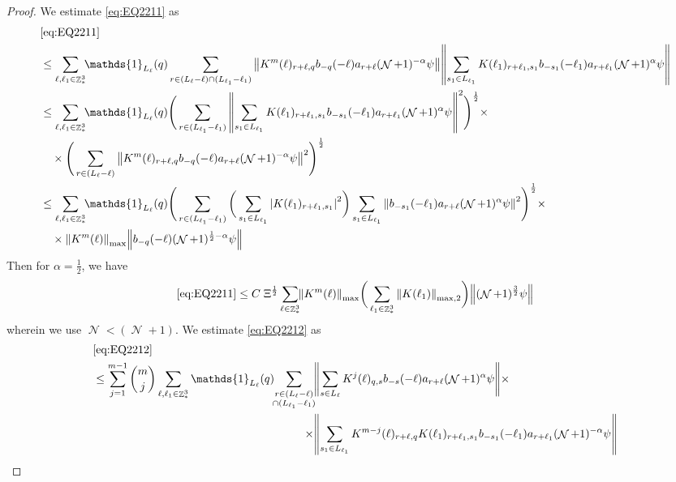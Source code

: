 \documentclass[sn-mathphys, Numbered ,a4paper]{sn-jnl}%
\DeclareMathOperator{\Z}{\mathbb{Z}}
\DeclareMathOperator{\NN}{\mathcal{N}}
\newcommand{\half}{\frac{1}{2}}
\theoremstyle{plain}
\theoremstyle{definition}
\theoremstyle{remark}
\theoremstyle{plain}
\theoremstyle{definition}
\theoremstyle{remark}
\begin{document}
{\begin{proof}
 We estimate \eqref{eq:EQ2211} as
 \begin{align}
 	&\eqref{eq:EQ2211}\nonumber\\
 	&\leq\sum\limits_{\ell,\ell_1 \in \Z^3_*} \!\!\mathds{1}_{L_\ell}(q) \sum\limits_{r\in (L_{\ell}-\ell) \cap (L_{\ell_1}-\ell_1)}    \norm{ K^{m}(\ell)_{r+\ell,q} b_{-q}(-\ell) a_{r+\ell} (\NN+1)^{-\alpha}\psi}\norm{ \sum\limits_{s_1 \in L_{\ell_1}} K(\ell_1)_{r+\ell_1,s_1} b_{-s_1}(-\ell_1)   a_{r+\ell_1} (\NN+1)^{\alpha}\psi } \nonumber\\
 	&\leq \sum\limits_{\ell,\ell_1 \in \Z^3_*} \!\!\mathds{1}_{L_\ell}(q) \Bigg( \sum\limits_{r\in (L_{\ell_1}-\ell_1)} \norm{\sum\limits_{s_1 \in L_{\ell_1}} K(\ell_1)_{r+\ell_1,s_1} b_{-s_1}(-\ell_1) a_{r+\ell_1} (\NN+1)^{\alpha}\psi}^2\Bigg)^\half \times\nonumber\\
 	&\quad \times \Bigg( \sum\limits_{r\in (L_{\ell}-\ell)}  \norm{K^{m}(\ell)_{r+\ell,q}  b_{-q}(-\ell) a_{r+\ell} (\NN+1)^{-\alpha}\psi }^2\Bigg)^\half \nonumber\\
 	&\leq \sum\limits_{\ell,\ell_1 \in \Z^3_*} \!\!\mathds{1}_{L_\ell}(q) \Bigg( \sum\limits_{r\in (L_{\ell_1}-\ell_1)} \bigg( \sum\limits_{s_1 \in L_{\ell_1}}\abs{K(\ell_1)_{r+\ell_1,s_1}}^2\bigg) \sum\limits_{s_1 \in L_{\ell_1}} \norm{ b_{-s_1}(-\ell_1)  a_{r+\ell} (\NN+1)^{\alpha}\psi}^2\Bigg)^\half \times\nonumber\\
 	&\quad \times  \norm{  K^{m}(\ell)}_{\mathrm{max}} \norm{b_{-q}(-\ell) (\NN+1)^{\half-\alpha}\psi } \nonumber
 \end{align}
 Then for $\alpha = \half$, we have 
 \begin{equation}
 	\eqref{eq:EQ2211}\leq C\;\Xi^\half \sum\limits_{\ell \in \Z^3_*} \!\! \norm{  K^{m}(\ell)}_{\mathrm{max}} \bigg(\sum\limits_{\ell_1 \in \Z^3_*} \norm{K(\ell_1)}_{\mathrm{max,2}} \bigg) \norm{ (\NN+1)^{\frac{3}{2}}\psi}  \label{eq:estEQ2211} 
 \end{equation}
 wherein we use $\NN<(\NN+1)$.
 We estimate \eqref{eq:EQ2212} as 
   \begin{alignat}{2}
 	&\eqref{eq:EQ2212}\nonumber\\
 	&\leq \sum\limits_{j=1}^{m-1} {{m}\choose j} \sum\limits_{\ell, \ell_1\in \Z^3_*} \mathds{1}_{L_{\ell}}(q)\!\! \begin{aligned}[t]
 		\sum\limits_{\substack{r\in (L_{\ell}-\ell) \\ \cap (L_{\ell_1}-\ell_1)}}\! &\norm{ \sum\limits_{s \in L_\ell} K^{j}(\ell)_{q,s}  b_{-s}(-\ell) a_{r+\ell} (\NN+1)^{\alpha}\psi}\times\nonumber \\\times &\norm{\sum\limits_{s_1 \in L_{\ell_1}} K^{m-j}(\ell)_{r+\ell,q} K(\ell_1)_{r+\ell_1,s_1} b_{-s_1}(-\ell_1)  a_{r+\ell_1} (\NN+1)^{-\alpha}\psi }

\end{aligned}
\end{alignat}
\end{proof}}
\end{document}
